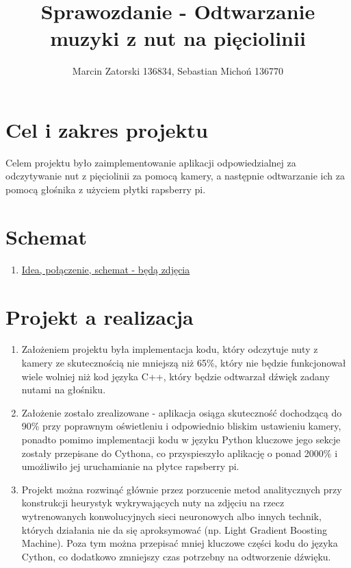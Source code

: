 \documentclass[12pt]{article}
\begin{document}
	\title{Sprawozdanie - Odtwarzanie muzyki z nut na pięciolinii}
	\author{Marcin Zatorski 136834, Sebastian Michoń 136770}
	\date{\vspace{-2ex}}
	\maketitle
	\section{Cel i zakres projektu}
	Celem projektu było zaimplementowanie aplikacji odpowiedzialnej za odczytywanie nut z pięciolinii za pomocą kamery, a następnie odtwarzanie ich za pomocą głośnika z użyciem płytki rapsberry pi.
	\section{Schemat}
	\begin{enumerate}
		\item \underline{Idea, połączenie, schemat - będą zdjęcia}
	\end{enumerate}
	
	\section{Projekt a realizacja}
	\begin{enumerate}
		\item Założeniem projektu była implementacja kodu, który odczytuje nuty z kamery ze skutecznością nie mniejszą niż 65\%, który nie będzie funkcjonował wiele wolniej niż kod języka C++, który będzie odtwarzał dźwięk zadany nutami na głośniku.
		\item Założenie zostało zrealizowane - aplikacja osiąga skuteczność dochodzącą do 90\% przy poprawnym oświetleniu i odpowiednio bliskim ustawieniu kamery, ponadto pomimo implementacji kodu w języku Python kluczowe jego sekcje zostały przepisane do Cythona, co przyspieszyło aplikację o ponad 2000\% i umożliwiło jej uruchamianie na płytce rapsberry pi.
		\item Projekt można rozwinąć głównie przez porzucenie metod analitycznych przy konstrukcji heurystyk wykrywających nuty na zdjęciu na rzecz wytrenowanych konwolucyjnych sieci neuronowych albo innych technik, których działania nie da się aproksymować (np. Light Gradient Boosting Machine). Poza tym można przepisać mniej kluczowe części kodu do języka Cython, co dodatkowo zmniejszy czas potrzebny na odtworzenie dźwięku.
	\end{enumerate}
\end{document}
